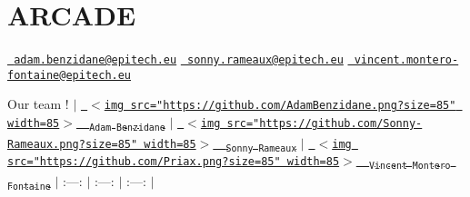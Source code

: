 \chapter{ARCADE}
\hypertarget{md_README}{}\label{md_README}
\label{md_README_autotoc_md0}%
%
 \href{mailto:adam.benzidane@epitech.eu}{\texttt{ adam.\+benzidane@epitech.\+eu}} \href{mailto:sonny.rameaux@epitech.eu}{\texttt{ sonny.\+rameaux@epitech.\+eu}} \href{mailto:vincent.montero-fontaine@epitech.eu}{\texttt{ vincent.\+montero-\/fontaine@epitech.\+eu}}

Our team ! \texorpdfstring{$\vert$}{|} \href{https://github.com/AdamBenzidane}{\texttt{ \texorpdfstring{$<$}{<}img src="{}https\+://github.\+com/\+Adam\+Benzidane.\+png?size=85"{} width=85\texorpdfstring{$>$}{>}~\newline
\textsubscript{Adam Benzidane}}} \texorpdfstring{$\vert$}{|} \href{https://github.com/Sonny-Rameaux}{\texttt{ \texorpdfstring{$<$}{<}img src="{}https\+://github.\+com/\+Sonny-\/\+Rameaux.\+png?size=85"{} width=85\texorpdfstring{$>$}{>}~\newline
\textsubscript{Sonny Rameaux}}} \texorpdfstring{$\vert$}{|} \href{https://github.com/Priax}{\texttt{ \texorpdfstring{$<$}{<}img src="{}https\+://github.\+com/\+Priax.\+png?size=85"{} width=85\texorpdfstring{$>$}{>}~\newline
\textsubscript{Vincent Montero Fontaine}}} \texorpdfstring{$\vert$}{|} \+:---\+: \texorpdfstring{$\vert$}{|} \+:---\+: \texorpdfstring{$\vert$}{|} \+:---\+: \texorpdfstring{$\vert$}{|} 
